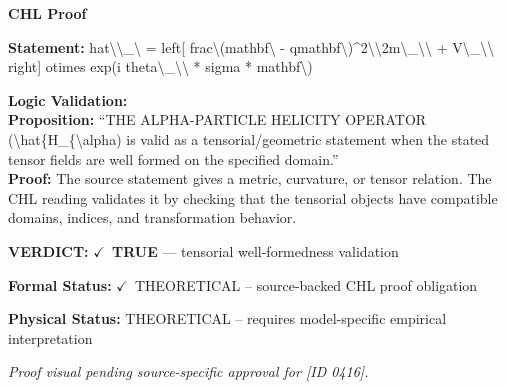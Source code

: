 \vspace{0.45em}
\noindent\textbf{CHL Proof}\par
\textbf{Statement:} hat\textbackslash{}\textbackslash{}\_\textbackslash{} = left[ frac\textbackslash{}(mathbf\textbackslash{} - qmathbf\textbackslash{})\textasciicircum{}2\textbackslash{}\textbackslash{}2m\textbackslash{}\_\textbackslash{}\textbackslash{} + V\textbackslash{}\_\textbackslash{}\textbackslash{} right] otimes exp(i
theta\textbackslash{}\_\textbackslash{}\textbackslash{} * sigma * mathbf\textbackslash{})

\textbf{Logic Validation:}\\
\textbf{Proposition:} ``THE ALPHA-PARTICLE HELICITY OPERATOR (\textbackslash{}hat\{H\_\{\textbackslash{}alpha) is valid as a
tensorial/geometric statement when the stated tensor fields are well formed on the
specified domain.''\\
\textbf{Proof:} The source statement gives a metric, curvature, or tensor relation. The CHL reading
validates it by checking that the tensorial objects have compatible domains, indices,
and transformation behavior.

\textbf{VERDICT:} \ensuremath{\checkmark}\ \textbf{TRUE} --- tensorial well-formedness validation

\textbf{Formal Status:} \ensuremath{\checkmark}\ THEORETICAL -- source-backed CHL proof obligation

\textbf{Physical Status:} THEORETICAL -- requires model-specific empirical interpretation
\par\vspace{0.45em}
\par
\vfill
\begingroup\footnotesize\itshape
Proof visual pending source-specific approval for [ID 0416].
\par\endgroup
\vfill
\endgroup
\endgroup
